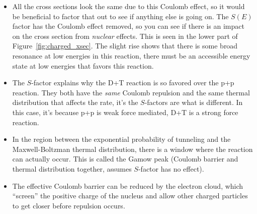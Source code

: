 \documentclass[letter]{article}
\begin{document}
\begin{itemize}
\item All the cross sections look the same due to this Coulomb effect,
  so it would be beneficial to factor that out to see if anything else
  is going on. The $S(E)$ factor has the Coulomb effect removed, so
  you can see if there is an impact on the cross section from
  \textit{nuclear} effects. This is seen in the lower part of
  Figure~\ref{fig:charged_xsec}. The slight rise shows that there is
  some broad resonance at low energies in this reaction, there must be
  an accessible energy state at low energies that favors this
  reaction.~\cite[Lec. 28]{lecture}
\item The $S$-factor explains why the D+T reaction is so favored over
  the p+p reaction. They both have the \textit{same} Coulomb repulsion
  and the same thermal distribution
  that affects the rate, it's the $S$-factors are what is
  different. In this case, it's because p+p is weak force mediated,
  D+T is a strong force reaction.~\cite[Lec. 28]{lecture}
\item In the region between the exponential probability of tunneling
  and the Maxwell-Boltzman thermal distribution, there is a window
  where the reaction can actually occur. This is called the Gamow peak
  (Coulomb barrier and thermal distribution together, assumes
  $S$-factor has no effect).~\cite[Lec. 28]{lecture}
\item The effective Coulomb barrier can be reduced by the electron
  cloud, which ``screen'' the positive charge of the nucleus and allow
  other charged particles to get closer before repulsion
  occurs.~\cite[Lec 28]{lecture}
\end{itemize}
\end{document}
